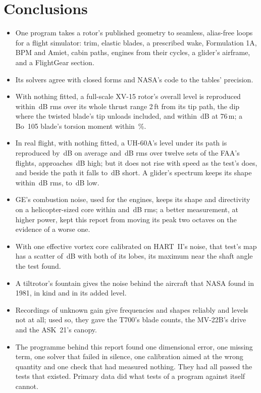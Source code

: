 \documentclass[10pt,a4paper,twocolumn]{article}
\begin{document}
\section{Conclusions}\label{sec:concl}
\begin{itemize}
\item One program takes a rotor's published geometry to seamless, alias-free loops for a flight simulator: trim, elastic blades, a prescribed wake, Formulation 1A, BPM and Amiet, cabin paths, engines from their cycles, a glider's airframe, and a FlightGear section.
\item Its solvers agree with closed forms and NASA's code to the tables' precision.
\item With nothing fitted, a full-scale XV-15 rotor's overall level is reproduced within \NStNearRms\,dB rms over its whole thrust range 2\,ft from its tip path, the dip where the twisted blade's tip unloads included, and within \NStFarRms\,dB at 76\,m; a Bo~105 blade's torsion moment within \NBoTorsMax\,\%.
\item In real flight, with nothing fitted, a UH-60A's level under its path is reproduced by \NFlMean\,dB on average and \NFlRms\,dB rms over twelve sets of the FAA's flights, approaches \NFlAppMean\,dB high; but it does not rise with speed as the test's does, and beside the path it falls \NFlSideLo{} to \NFlSideHi\,dB short. A glider's spectrum keeps its shape within \NPrShape\,dB rms, \NPrLo{} to \NPrHi\,dB low.
\item GE's combustion noise, used for the engines, keeps its shape and directivity on a helicopter-sized core within \NCoShape{} and \NCoDi\,dB rms; a better measurement, at higher power, kept this report from moving its peak two octaves on the evidence of a worse one.
\item With one effective vortex core calibrated on HART~II's noise, that test's map has a scatter of \NHtMapRms\,dB with both of its lobes, its maximum near the shaft angle the test found.
\item A tiltrotor's fountain gives the noise behind the aircraft that NASA found in 1981, in kind and in its added level.
\item Recordings of unknown gain give frequencies and shapes reliably and levels not at all; used so, they gave the T700's blade counts, the MV-22B's drive and the ASK~21's canopy.
\item The programme behind this report found one dimensional error, one missing term, one solver that failed in silence, one calibration aimed at the wrong quantity and one check that had measured nothing. They had all passed the tests that existed. Primary data did what tests of a program against itself cannot.
\end{itemize}
\end{document}
